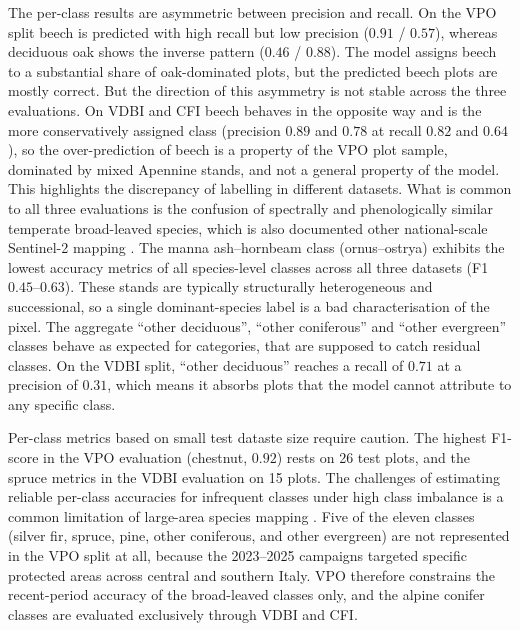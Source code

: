 \documentclass[essd, manuscript]{copernicus}
\begin{document}
The per-class results are asymmetric between precision and recall. On the VPO split beech is predicted with high recall but low precision ($0.91$ / $0.57$), whereas deciduous oak shows the inverse pattern ($0.46$ / $0.88$). The model assigns beech to a substantial share of oak-dominated plots, but the predicted beech plots are mostly correct. But the direction of this asymmetry is not stable across the three evaluations. On VDBI and CFI beech behaves in the opposite way and is the more conservatively assigned class (precision $0.89$ and $0.78$ at recall $0.82$ and $0.64$), so the over-prediction of beech is a property of the VPO plot sample, dominated by mixed Apennine stands, and not a general property of the model. This highlights the discrepancy of labelling in different datasets. What is common to all three evaluations is the confusion of spectrally and phenologically similar temperate broad-leaved species, which is also documented other national-scale Sentinel-2 mapping \citep{hemmerling_mapping_2021,grabska-szwagrzyk_map_2024}. The manna ash–hornbeam class (ornus--ostrya) exhibits the lowest accuracy metrics of all species-level classes across all three datasets (F1 $0.45$–$0.63$). These stands are typically structurally heterogeneous and successional, so a single dominant-species label is a bad characterisation of the pixel. The aggregate ``other deciduous'', ``other coniferous'' and ``other evergreen'' classes behave as expected for categories, that are supposed to catch residual classes. On the VDBI split, ``other deciduous'' reaches a recall of $0.71$ at a precision of $0.31$, which means it absorbs plots that the model cannot attribute to any specific class.%

Per-class metrics based on small test dataste size require caution. The highest F1-score in the VPO evaluation (chestnut, $0.92$) rests on 26 test plots, and the spruce metrics in the VDBI evaluation on 15 plots.%
The challenges of estimating reliable per-class accuracies for infrequent classes under high class imbalance is a common limitation of large-area species mapping \citep{hemmerling_mapping_2021,grabska-szwagrzyk_map_2024}. Five of the eleven classes (silver fir, spruce, pine, other coniferous, and other evergreen) are not represented in the VPO split at all, because the 2023–2025 campaigns targeted specific protected areas across central and southern Italy. VPO therefore constrains the recent-period accuracy of the broad-leaved classes only, and the alpine conifer classes are evaluated exclusively through VDBI and CFI.
\end{document}

